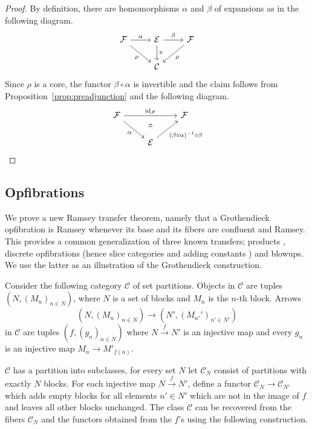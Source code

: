 \documentclass[preprint,12pt]{elsarticle}
\newcommand{\cat}[1]{\mathcal{#1}}
\DeclareMathOperator{\id}{id}
\begin{document}
\begin{proof}
    By definition, there are homomorphisms $\alpha$ and $\beta$ of expansions as in the following diagram.
    $$
    \begin{tikzcd}
    \cat F \arrow[r, "\alpha"] \arrow[rd, "\rho"']
    & 
    \cat E \arrow[r, "\beta"] \arrow[d, "\pi"] & 
    \cat F \arrow[ld, "\rho"] \\
    & \cat C   &                            
\end{tikzcd}
    $$
Since $\rho$ is a core, the functor $\beta\circ \alpha$ is invertible and the claim follows from Proposition~\ref{prop:preadjunction} and the following diagram.
    $$
    \begin{tikzcd}
    \cat F \arrow[rd, "\alpha"'] \arrow[rr, "\id_{\cat F}", ""name=alpha] &        &  \cat F \\
    & \cat E\arrow[ru, "(\beta\circ \alpha)^{-1}\circ \beta"'] & 
    \arrow[to=2-2, from=alpha, pos=.5, phantom, "\circ"]
    \end{tikzcd}
    $$
\end{proof}



\subsection{Opfibrations}
We prove a new Ramsey transfer theorem, namely that a Grothendieck opfibration is Ramsey whenever its base and its fibers are confluent and Ramsey. This provides a common generalization of three known transfers; products \cite{sokic2012ramsey}, discrete opfibrations \cite{mavsulovic2023fibrations} (hence slice categories and adding constants \cite{bodirsky2013decidability}) and blowups. We use the latter as an illustration of the Grothendieck construction.

\begin{exam}
\label{ex:partitions}
Consider the following category $\cat C$ of set partitions. Objects in $\cat C$ are tuples $(N, (M_n)_{n\in N})$, where $N$ is a set of blocks and $M_n$ is the $n$-th block. Arrows 
$$
(N, (M_n)_{n\in N})\to(N', (M_{n'}')_{n'\in N'})
$$ 
in $\cat C$ are tuples $(f,(g_n)_{n\in N})$ where $N\xrightarrow{f}N'$ is an injective map and every $g_n$ is an injective map $M_n\to M'_{f(n)}$.

$\cat C$ has a partition into subclasses, for every set $N$ let $\cat C_N$ consist of partitions with exactly $N$ blocks. For each injective map $N\xrightarrow{f}N'$, define a functor $\cat C_N\to\cat C_{N'}$ which adds empty blocks for all elements $n'\in N'$ which are not in the image of $f$ and leaves all other blocks unchanged. The class $\cat C$ can be recovered from the fibers $\cat C_N$ and the functors obtained from the $f$'s using the following construction. 
\end{exam}
\end{document}
